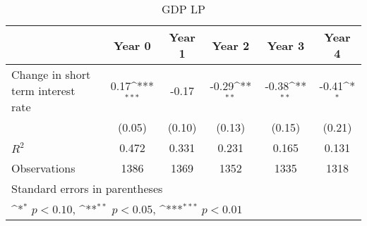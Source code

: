 \documentclass{article}
\begin{document}
\begin{table}[htbp]\centering
\def\sym#1{\ifmmode^{#1}\else\(^{#1}\)\fi}
\caption{GDP LP}
\begin{tabular}{l*{5}{c}}
\hline\hline
                    &\multicolumn{1}{c}{Year 0}&\multicolumn{1}{c}{Year 1}&\multicolumn{1}{c}{Year 2}&\multicolumn{1}{c}{Year 3}&\multicolumn{1}{c}{Year 4}\\
\hline
Change in short term interest rate&        0.17\sym{***}&       -0.17         &       -0.29\sym{**} &       -0.38\sym{**} &       -0.41\sym{*}  \\
                    &      (0.05)         &      (0.10)         &      (0.13)         &      (0.15)         &      (0.21)         \\
\hline
\(R^{2}\)           &       0.472         &       0.331         &       0.231         &       0.165         &       0.131         \\
Observations        &        1386         &        1369         &        1352         &        1335         &        1318         \\
\hline\hline
\multicolumn{6}{l}{\footnotesize Standard errors in parentheses}\\
\multicolumn{6}{l}{\footnotesize \sym{*} \(p<0.10\), \sym{**} \(p<0.05\), \sym{***} \(p<0.01\)}\\
\end{tabular}
\end{table}
\end{document}
